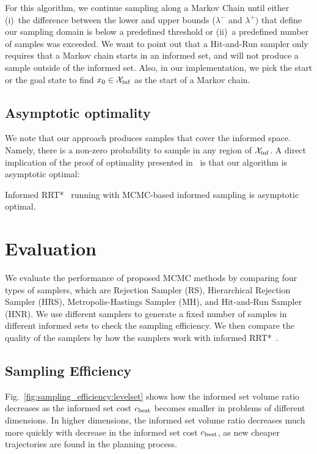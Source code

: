 \documentclass[letterpaper, 10 pt, conference]{ieeeconf}  %
\begin{document}
For this algorithm, we continue sampling along a Markov Chain until either 
(i)~the difference between the lower and upper bounds ($\lambda^-$ and $\lambda^+)$ 
that define our sampling domain is below a predefined threshold or
(ii)~a predefined number of samples was exceeded.
We want to point out that a Hit-and-Run sampler only requires that a Markov chain starts in an informed set, and will not produce a sample outside of the informed set.
Also, in our implementation, we pick the start or the goal state to find $ x_0 \in \mathcal{X}_{\rm {inf}} $ as the start of a Markov chain.



\subsection{Asymptotic optimality}
We note that our approach produces samples that cover the informed space. 
Namely, there is a non-zero probability to sample in any region of $\mathcal{X}_{\rm {inf}}$.
A direct implication of the proof of optimality presented in~\cite{KF11} is that our algorithm is asymptotic optimal:

\begin{prop}
	\label{prop:asym_opt}
	Informed RRT*~\cite{GSB14} running with MCMC-based informed sampling is asymptotic optimal.	
\end{prop}

\section{Evaluation}
\label{sec:eval}

We evaluate the performance of proposed MCMC methods by comparing four types of samplers, which are Rejection Sampler (RS), Hierarchical Rejection Sampler (HRS), Metropolis-Hastings Sampler (MH), and Hit-and-Run Sampler (HNR).
We use different samplers to generate a fixed number of samples in different informed sets to check the sampling efficiency. %
We then compare the quality of the samplers by how the samplers work with informed RRT*~\cite{GSB14}.

\subsection{Sampling Efficiency}

Fig.~\ref{fig:sampling_efficiency:levelset} shows how the informed set volume ratio decreases as the informed set cost $ c_{\rm best} $ becomes smaller in problems of different dimensions.
In higher dimensions, the informed set volume ratio decreases much more quickly with decrease in the informed set cost $ c_{\rm best} $, as new cheaper trajectories are found in the planning process.
\end{document}
